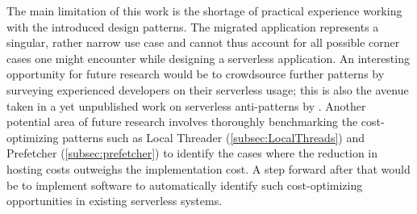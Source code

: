 The main limitation of this work is the shortage of practical experience working with the introduced design patterns. The migrated application represents a singular, rather narrow use case and cannot thus account for all possible corner cases one might encounter while designing a serverless application. An interesting opportunity for future research would be to crowdsource further patterns by surveying experienced developers on their serverless usage; this is also the avenue taken in a yet unpublished work on serverless anti-patterns by \textcite{taibi19antipatterns}. Another potential area of future research involves thoroughly benchmarking the cost-optimizing patterns such as Local Threader (\ref{subsec:LocalThreads}) and Prefetcher (\ref{subsec:prefetcher}) to identify the cases where the reduction in hosting costs outweighs the implementation cost. A step forward after that would be to implement software to automatically identify such cost-optimizing opportunities in existing serverless systems.

